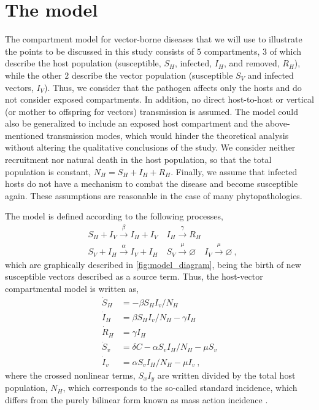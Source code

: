 \section{The model}\label{sec:model}

The compartment model for vector-borne diseases that we will use to
illustrate the points to be discussed in this study consists of $5$
compartments, $3$ of which describe the host population (susceptible, $S_H$,
infected, $I_H$, and removed, $R_H$), while the other $2$ describe the vector
population (susceptible $S_V$ and infected vectors, $I_V$). Thus, we consider
that the pathogen affects only the hosts and do not consider exposed
compartments. In addition, no direct host-to-host or vertical (or mother to
offspring for vectors) transmission is assumed. The model could also be
generalized to include an exposed host compartment and the above-mentioned
transmission modes, which would hinder the theoretical analysis without
altering the qualitative conclusions of the study. We consider neither
recruitment nor natural death in the host population, so that the total
population is constant, $N_H=S_H+I_H+R_H$. Finally, we assume that
infected hosts do not have a mechanism to combat the disease and become
susceptible again. These assumptions are reasonable in the case of many
phytopathologies.

The model is defined according to the following processes,
\begin{equation}\label{eq:scheme_infection}
    \begin{aligned}
         & S_H+I_V \stackrel{\beta}{\rightarrow} I_H + I_V \quad I_H
        \stackrel{\gamma}{\rightarrow} R_H                           \\
         & S_V+I_H \stackrel{\alpha}{\rightarrow} I_V+I_H \quad S_V
        \stackrel{\mu}{\rightarrow} \varnothing \quad I_V
        \stackrel{\mu}{\rightarrow}
        \varnothing
        \ ,
    \end{aligned}
\end{equation}
which are graphically described in \cref{fig:model_diagram}, being the
birth of new susceptible vectors described as a source term.
Thus, the host-vector compartmental model is written as,
\begin{equation}\label{eq:SIR_v}
    \begin{aligned}
        \dot{S}_H & =-\beta S_H I_v / N_H                     \\
        \dot{I}_H & =\beta S_H I_v / N_H - \gamma I_H         \\
        \dot{R}_H & =\gamma I_H                               \\
        \dot{S}_v & = \delta C-\alpha S_v I_H / N_H - \mu S_v \\
        \dot{I}_v & =\alpha S_v I_H / N_H - \mu I_v \ ,
    \end{aligned}
\end{equation}
where the crossed nonlinear terms, $S_x I_y$ are written divided by the
total host population, $N_H$, which corresponds to the so-called standard
incidence, which differs from the purely bilinear form known as mass action
incidence \cite{MartchevaBook}.

